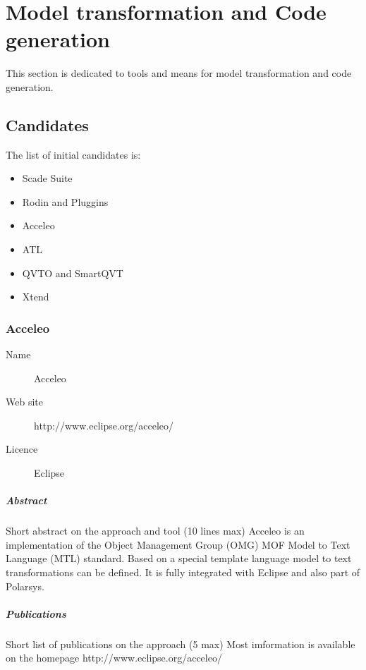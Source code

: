 

\chapter{Model transformation and Code generation}
\label{sec:transfo}

This section is dedicated to tools and means for model transformation and code generation.



\section{Candidates}


The list of initial candidates is:


\begin{itemize}
\item Scade Suite
\item Rodin and Pluggins
\item Acceleo
\item ATL
\item QVTO and SmartQVT
\item Xtend
\end{itemize}

\subsection{Acceleo}

\begin{description}
\item[Name] Acceleo
\item[Web site] http://www.eclipse.org/acceleo/
\item[Licence] Eclipse
\end{description}

\paragraph{Abstract} Short abstract on the approach and tool (10 lines max)
Acceleo is an implementation of the Object Management Group (OMG) MOF Model to Text Language (MTL) standard. Based on a special template language model to text transformations can be defined. It is fully integrated with Eclipse and also part of Polarsys.

\paragraph{Publications} Short list of publications on the approach (5 max)
Most imformation is available on the homepage http://www.eclipse.org/acceleo/



